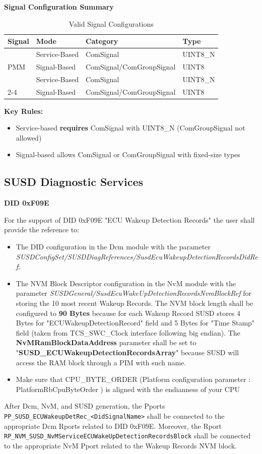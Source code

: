 {\textbf{Signal Configuration Summary} 

\begin{table}[]
\centering
\begin{tabular}{|l|l|l|l|}
\hline
\textbf{Signal} & \textbf{Mode} & \textbf{Category} & \textbf{Type} \\ \hline
\multirow{3}{*}{PMM} & Service-Based & ComSignal & UINT8\_N \\ \cline{2-4} 
 & Signal-Based & ComSignal/ComGroupSignal & UINT8 \\ \hline
\multirow{3}{*}{BPMM} & Service-Based & ComSignal & UINT8\_N \\ \cline{2-4} 
 & Signal-Based & ComSignal/ComGroupSignal & UINT8 \\ \hline
\end{tabular}
\caption{Valid Signal Configurations}
\label{tab:signalconfigs}
\end{table}

\textbf{Key Rules:}
\begin{itemize}
	\item Service-based \textbf{requires} ComSignal with UINT8\_N (ComGroupSignal not allowed)
	\item Signal-based allows ComSignal or ComGroupSignal with fixed-size types
\end{itemize}

\subsection{SUSD Diagnostic Services}
\label{subsection:SUSDDiagnosticServices}
\textbf{ DID 0xF09E}

For the support of DID 0xF09E "ECU Wakeup Detection Records" the user shall provide the reference to:
\begin{itemize}
\item The DID configuration in the Dcm module with the parameter \textit{SUSDConfigSet/SUSDDiagReferences/SusdEcuWakeupDetectionRecordsDidRef};
\item The NVM Block Descriptor configuration in the NvM module with the parameter \textit{SUSDGeneral/SusdEcuWakeUpDetectionRecordsNvmBlockRef} for storing the 10 most recent Wakeup Records. The NVM block length shall be configured to \textbf{90 Bytes} because for each Wakeup Record SUSD stores 4 Bytes for "ECUWakeupDetectionRecord" field and 5 Bytes for "Time Stamp" field (taken from TCS\_SWC\_Clock interface following big endian). The \textbf{NvMRamBlockDataAddress} parameter shall be set to "\textbf{SUSD\_ECUWakeupDetectionRecordsArray}" because SUSD will access the RAM block through a PIM with such name.
\item Make sure that CPU\_BYTE\_ORDER (Platform configuration parameter : PlatformRbCpuByteOrder ) is aligned with the endianness of your CPU
\end{itemize}
After Dcm, NvM, and SUSD generation, the Pports \texttt{PP\_SUSD\_ECUWakeupDetRec\_<DidSignalName>} shall be connected to the appropriate Dcm Rports related to DID 0xF09E. Moreover, the Rport\\ \texttt{RP\_NVM\_SUSD\_NvMServiceECUWakeUpDetectionRecordsBlock} shall be connected to the appropriate NvM Pport related to the Wakeup Records NVM block.

}
